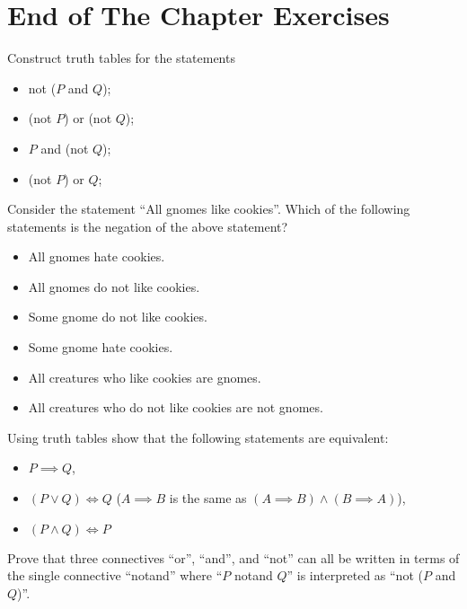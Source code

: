 \section*{End of The Chapter Exercises}
\begin{exercises}
  \exerciseitem Construct truth tables for the statements
    \begin{itemize}
      \item not ($P$ and $Q$);
      \item (not $P$) or (not $Q$);
      \item $P$ and (not $Q$);
      \item (not $P$) or $Q$;
    \end{itemize}
  \exerciseitem Consider the statement ``All gnomes like cookies''. Which of
    the following statements is the negation of the above statement?
    \begin{itemize}
      \item All gnomes hate cookies.
      \item All gnomes do not like cookies.
      \item Some gnome do not like cookies.
      \item Some gnome hate cookies.
      \item All creatures who like cookies are gnomes.
      \item All creatures who do not like cookies are not gnomes.
    \end{itemize}
  \exerciseitem Using truth tables show that the following statements are
    equivalent:
    \begin{itemize}
      \item $P \implies Q$,
      \item $(P \lor Q) \iff Q$
        ($A \implies B$ is the same as $(A \implies B) \land (B \implies A)$),
      \item $(P \land Q) \iff P$
    \end{itemize}
  \exerciseitem Prove that three connectives ``or'', ``and'', and ``not'' can
    all be written in terms of the single connective ``notand'' where ``$P$
    notand $Q$'' is interpreted as ``not ($P$ and $Q$)''.
\end{exercises}
